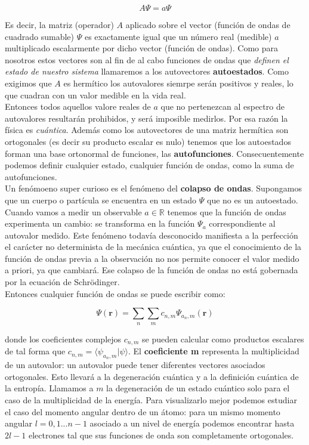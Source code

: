 \documentclass[12pt,a4paper]{article}
\numberwithin{equation}{section}
\numberwithin{figure}{section}
\newcommand{\rn}{\mathbf{r}}
\begin{document}
\begin{equation}
A \Psi = a \Psi
\end{equation}

Es decir, la matriz (operador) $A$ aplicado sobre el vector (función de ondas de cuadrado sumable) $\Psi$ es exactamente igual que un número real (medible) $a$ multiplicado escalarmente por dicho vector (función de ondas). Como para nosotros estos vectores son al fin de al cabo funciones de ondas que \textit{definen el estado de nuestro sistema} llamaremos a los autovectores \textbf{autoestados}. Como exigimos que $A$ es hermítico los autovalores siemrpe serán positivos y reales, lo que cuadran con un valor medible en la vida real. \\

Entonces todos aquellos valore reales de $a$ que no pertenezcan al espectro de autovalores resultarán prohibidos, y será imposible medirlos. Por esa razón la física es \textit{cuántica}. Además como los autovectores de una matriz hermítica son ortogonales (es decir su producto escalar es nulo) tenemos que los autoestados forman una base ortonormal de funciones, las \textbf{autofunciones}. Consecuentemente podemos definir cualquier estado, cualquier función de ondas, como la suma de autofunciones. \\

Un fenómoeno super curioso es el fenómeno del \textbf{colapso de ondas}. Supongamos que un cuerpo o partícula se encuentra en un estado $\Psi$ que no es un autoestado. Cuando vamos a medir un observable $a \in \mathbb{R}$ tenemos que la función de ondas experimenta un cambio: se transforma en la función $\Psi_a$ correspondiente al autovalor medido. Este fenómeno todavía desconocido manifiesta a la perfección el carácter no determinista de la mecánica cuántica, ya que el conocimiento de la función de ondas previa a la observación no nos permite conocer el valor medido a priori, ya que cambiará. Ese colapso de la función de ondas no está gobernada por la ecuación de Schrödinger. \\

Entonces cualquier función de ondas se puede escribir como:

\begin{equation}
\Psi ( \rn ) = \sum_n \sum_m c_{n,m} \Psi_{a_n,m} ( \rn )
\end{equation}

donde los coeficientes complejos $c_{n,m}$ se pueden calcular como productos escalares de tal forma que $c_{n,m} = \langle \psi_{a_n,m} | \psi \rangle$. El \textbf{coeficiente m} representa la multiplicidad de un autovalor: un autovalor puede tener diferentes vectores asociados ortogonales. Esto llevará a la degeneración cuántica y a la definición cuántica de la entropía. Llamamos a $m$ la degeneración de un estado cuántico solo para el caso de la multiplicidad de la energía. Para visualizarlo mejor podemos estudiar el caso del momento angular dentro de un átomo: para un mismo momento angular $l=0,1...n-1$ asociado a un nivel de energía podemos encontrar hasta $2l-1$ electrones tal que sus funciones de onda son completamente ortogonales. \\
\end{document}

